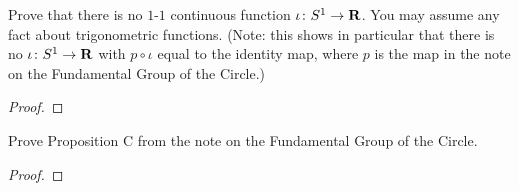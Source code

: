\newpage
\begin{problem}[(C)]
Prove that there is no $1$-$1$ continuous function $\iota\colon
S^1\to\mathbf{R}$. You may assume any fact about trigonometric
functions. (Note: this shows in particular that there is no
$\iota\colon S^1\to\mathbf{R}$ with $p\circ\iota$ equal to the identity
map, where $p$ is the map in the note on the Fundamental Group of
the Circle.)
\end{problem}
\begin{proof}
\end{proof}
\newpage
\begin{problem}[(D)]
Prove Proposition C from the note on the Fundamental Group of the Circle.
\end{problem}
\begin{proof}
\end{proof}

